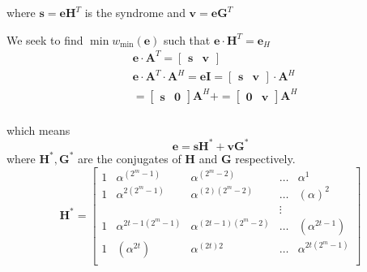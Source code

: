 \documentclass[fontsize=12pt]{article}
\begin{document}
where $\mathbf{s}=\mathbf{e}\mathbf{H}^T$ is the syndrome and $\mathbf{v}=\mathbf{e}\mathbf{G}^T$



We seek to find $\min w_{\min}(\mathbf{e})$ such that $\mathbf{e}\cdot\mathbf{H}^T=\mathbf{e}_H$
\begin{equation}
\begin{split}
&\mathbf{e}\cdot \mathbf{A}^T =\begin{bmatrix} \mathbf{s} &
\mathbf{v} \end{bmatrix}\\
&\mathbf{e}\cdot \mathbf{A}^T\cdot\mathbf{A}^{H}=\mathbf{e}\mathbf{I}=
\begin{bmatrix} \mathbf{s} &
\mathbf{v} \end{bmatrix}\cdot\mathbf{A}^{H}\\
&=\begin{bmatrix} \mathbf{s} &
\mathbf{0}\end{bmatrix}\mathbf{A}^{H}
+
=\begin{bmatrix} \mathbf{0} &\mathbf{v} 
\end{bmatrix}\mathbf{A}^{H}\\
\end{split}
\end{equation}

which means 
\begin{equation}
\mathbf{e}=\mathbf{s}\mathbf{H}^{*}+\mathbf{v}\mathbf{G}^{*}
\label{10}
\end{equation}
 where $\mathbf{H}^{*},\mathbf{G}^{*}$ are the conjugates of $\mathbf{H}$ and
 $\mathbf{G}$ respectively.
 \begin{equation}
\mathbf{H}^{*}=
\begin{bmatrix}
    1        &  \alpha^{(2^m-1)} &  \alpha^{(2^m-2)}  & \dots  &  \alpha^{1} \\
    1      &  \alpha^{2(2^m-1)} &   \alpha^{(2)(2^m-2)}  & \dots   &  ( \alpha )^2\\
    &&&\vdots{} \\
    1       &  \alpha^{2t-1(2^m-1)}& \alpha^{(2t-1)(2^m-2)}  & \dots &  (\alpha^{2t-1})   \\
    1       &  ( \alpha^{2t} ) &  \alpha^{(2t)2}  & \dots &  \alpha^{2t(2^m-1)}  \\
\end{bmatrix}
\end{equation}
\end{document}
